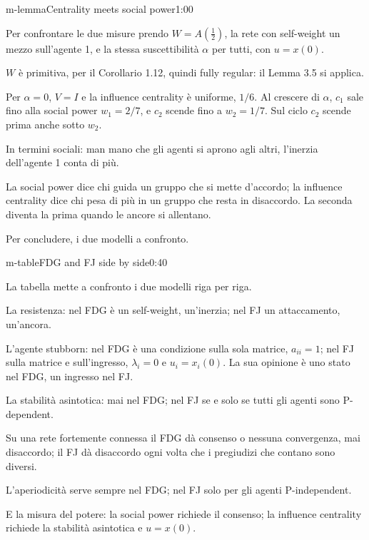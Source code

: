 \begin{slide}{m-lemma}{Centrality meets social power}{1:00}
  \begin{discorso}
    \item Per confrontare le due misure prendo $W=A(\tfrac12)$, la rete con self-weight un mezzo sull'agente 1, e la stessa suscettibilità $\alpha$ per tutti, con $u=x(0)$.
    \item $W$ è primitiva, per il Corollario 1.12, quindi fully regular: il Lemma 3.5 si applica.
    \item Per $\alpha=0$, $V=I$ e la influence centrality è uniforme, $1/6$. Al crescere di $\alpha$, $c_1$ sale fino alla social power $w_1=2/7$, e $c_2$ scende fino a $w_2=1/7$. Sul ciclo $c_2$ scende prima anche sotto $w_2$.
    \item In termini sociali: man mano che gli agenti si aprono agli altri, l'inerzia dell'agente 1 conta di più.
    \item La social power dice chi guida un gruppo che si mette d'accordo; la influence centrality dice chi pesa di più in un gruppo che resta in disaccordo. La seconda diventa la prima quando le ancore si allentano.
    \item Per concludere, i due modelli a confronto.
  \end{discorso}
\end{slide}


\begin{slide}{m-table}{FDG and FJ side by side}{0:40}
  \begin{discorso}
    \item La tabella mette a confronto i due modelli riga per riga.
    \item La resistenza: nel FDG è un self-weight, un'inerzia; nel FJ un attaccamento, un'ancora.
    \item L'agente stubborn: nel FDG è una condizione sulla sola matrice, $a_{ii}=1$; nel FJ sulla matrice e sull'ingresso, $\lambda_i=0$ e $u_i=x_i(0)$. La sua opinione è uno stato nel FDG, un ingresso nel FJ.
    \item La stabilità asintotica: mai nel FDG; nel FJ se e solo se tutti gli agenti sono P-dependent.
    \item Su una rete fortemente connessa il FDG dà consenso o nessuna convergenza, mai disaccordo; il FJ dà disaccordo ogni volta che i pregiudizi che contano sono diversi.
    \item L'aperiodicità serve sempre nel FDG; nel FJ solo per gli agenti P-independent.
    \item E la misura del potere: la social power richiede il consenso; la influence centrality richiede la stabilità asintotica e $u=x(0)$.
  \end{discorso}
\end{slide}

